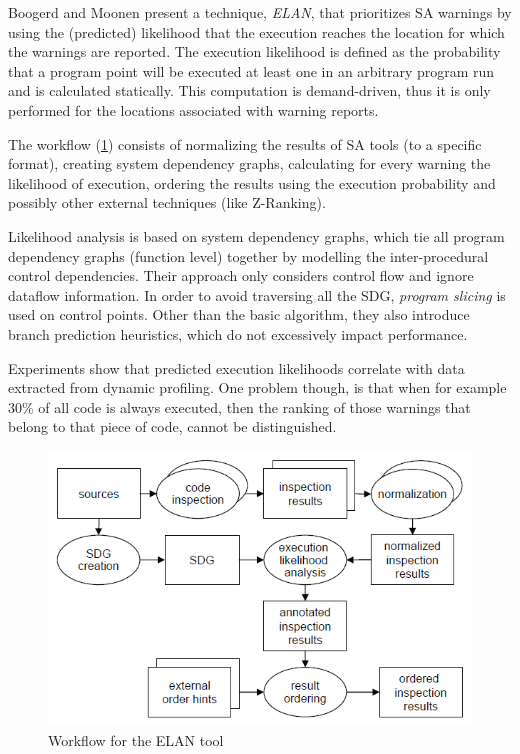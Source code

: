  Boogerd and Moonen \cite{static_profiling} present a technique, \textit{ELAN}, that prioritizes SA warnings by using the (predicted) likelihood that the execution reaches the location for which the warnings are reported. The execution likelihood is defined as the probability that a program point will be executed at least one in an arbitrary program run and is calculated statically. This computation is demand-driven, thus it is only performed for the locations associated with warning reports.

 The workflow (\cref{elan:workflow}) consists of normalizing the results of SA tools (to a specific format), creating system dependency graphs, calculating for every warning the likelihood of execution, ordering the results using the execution probability and possibly other external techniques (like Z-Ranking). 

 Likelihood analysis is based on system dependency graphs, which tie all program dependency graphs (function level) together by modelling the inter-procedural control dependencies. Their approach only considers control flow and ignore dataflow information. In order to avoid traversing all the SDG, \textit{program slicing} is used on control points. Other than the basic algorithm, they also introduce branch prediction heuristics, which do not excessively impact performance.

 Experiments show that predicted execution likelihoods correlate with data extracted from dynamic profiling. One problem though, is that when for example 30\% of all code is always executed, then the ranking of those warnings that belong to that piece of code, cannot be distinguished.

 \begin{figure}[H]
     \centering
     \includegraphics[scale=0.4]{./src/elan_workflow.png}
     \caption{Workflow for the ELAN tool}\label{elan:workflow}
 \end{figure}


